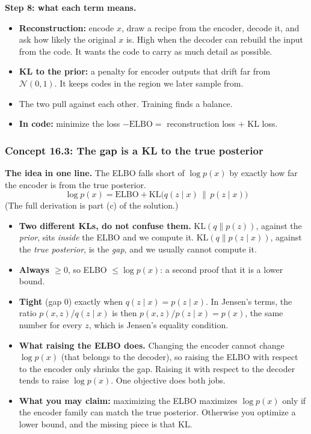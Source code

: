 \documentclass[12pt,a4paper]{article}
\begin{document}
\textbf{Step 8: what each term means.}
\begin{itemize}[nosep]
  \item \textbf{Reconstruction:} encode $x$, draw a recipe from the encoder, decode it, and ask how likely the original $x$ is. High when the decoder can rebuild the input from the code. It wants the code to carry as much detail as possible.
  \item \textbf{KL to the prior:} a penalty for encoder outputs that drift far from $\mathcal{N}(0,1)$. It keeps codes in the region we later sample from.
  \item The two pull against each other. Training finds a balance.
  \item \textbf{In code:} minimize the loss $-\text{ELBO}=$ reconstruction loss $+$ KL loss.
\end{itemize}

\subsubsection{Concept 16.3: The gap is a KL to the true posterior}\label{c16-3}

\textbf{The idea in one line.} The ELBO falls short of $\log p(x)$ by exactly how far the encoder is from the true posterior.
\[
\log p(x)=\text{ELBO}+\mathrm{KL}\big(q(z\mid x)\,\|\,p(z\mid x)\big)
\]
(The full derivation is part (c) of the solution.)
\begin{itemize}[nosep]
  \item \textbf{Two different KLs, do not confuse them.} $\mathrm{KL}(q\|p(z))$, against the \emph{prior}, sits \emph{inside} the ELBO and we compute it. $\mathrm{KL}(q\|p(z\mid x))$, against the \emph{true posterior}, is the \emph{gap}, and we usually cannot compute it.
  \item \textbf{Always $\ge0$}, so ELBO $\le\log p(x)$: a second proof that it is a lower bound.
  \item \textbf{Tight} (gap 0) exactly when $q(z\mid x)=p(z\mid x)$. In Jensen's terms, the ratio $p(x,z)/q(z\mid x)$ is then $p(x,z)/p(z\mid x)=p(x)$, the same number for every $z$, which is Jensen's equality condition.
  \item \textbf{What raising the ELBO does.} Changing the encoder cannot change $\log p(x)$ (that belongs to the decoder), so raising the ELBO with respect to the encoder only shrinks the gap. Raising it with respect to the decoder tends to raise $\log p(x)$. One objective does both jobs.
  \item \textbf{What you may claim:} maximizing the ELBO maximizes $\log p(x)$ only if the encoder family can match the true posterior. Otherwise you optimize a lower bound, and the missing piece is that KL.
\end{itemize}
\end{document}
